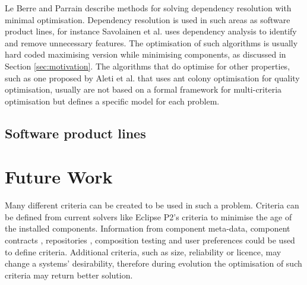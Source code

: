 Le Berre and Parrain \citep{Berre2008} describe methods for solving dependency resolution with minimal optimisation.
Dependency resolution is used in such areas as software product lines,
for instance Savolainen et al. \citep{savolainen_analyzing_2007} uses dependency analysis to identify and remove unnecessary features.
The optimisation of such algorithms is usually hard coded maximising version while minimising components, 
as discussed in Section \ref{sec:motivation}.
The algorithms that do optimise for other properties, 
such as one proposed by Aleti et al. \citep{Aleti2009} that uses ant colony optimisation for quality optimisation,
usually are not based on a formal framework for multi-criteria optimisation but defines a specific model for each problem.

\subsection{Software product lines}


\section{Future Work}






Many different criteria can be created to be used in such a problem.
Criteria can be defined from current solvers like Eclipse P2's criteria to minimise the age of the installed components.
Information from component meta-data, component contracts \citep{Watkins1999}, repositories \citep{Guo2000}, 
composition testing \citep{XuejieZhang2008} and user preferences could be used to define criteria.
Additional criteria, such as size, reliability or licence, may change a systems' desirability, 
therefore during evolution the optimisation of such criteria may return better solution.

